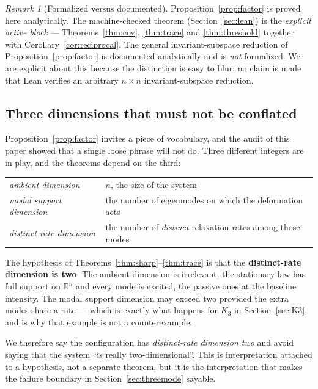\documentclass[11pt]{article}
\theoremstyle{plain}
\theoremstyle{definition}
\theoremstyle{remark}
\newtheorem{remark}[theorem]{Remark}
\newcommand{\Real}{\mathbb{R}}
\begin{document}
\begin{remark}[Formalized versus documented]\label{rem:formalized}
Proposition~\ref{prop:factor} is proved here analytically. The machine-checked theorem
(Section~\ref{sec:lean}) is the \emph{explicit active block} --- Theorems~\ref{thm:cov},
\ref{thm:trace} and \ref{thm:threshold} together with Corollary~\ref{cor:reciprocal}. The general
invariant-subspace reduction of Proposition~\ref{prop:factor} is documented analytically and is
\emph{not} formalized. We are explicit about this because the distinction is easy to blur: no
claim is made that Lean verifies an arbitrary $n\times n$ invariant-subspace reduction.
\end{remark}

\subsection{Three dimensions that must not be conflated}\label{sec:effdim}

Proposition~\ref{prop:factor} invites a piece of vocabulary, and the audit of this paper showed
that a single loose phrase will not do. Three different integers are in play, and the theorems
depend on the third:

\begin{center}
\begin{tabular}{@{}ll@{}}
\toprule
\emph{ambient dimension} & $n$, the size of the system\\
\emph{modal support dimension} & the number of eigenmodes on which the deformation acts\\
\emph{distinct-rate dimension} & the number of \emph{distinct} relaxation rates among those modes\\
\bottomrule
\end{tabular}
\end{center}

The hypothesis of Theorems~\ref{thm:sharp}--\ref{thm:trace} is that the \textbf{distinct-rate
dimension is two}. The ambient dimension is irrelevant; the stationary law has full support on
$\Real^n$ and every mode is excited, the passive ones at the baseline intensity. The modal
support dimension may exceed two provided the extra modes share a rate --- which is exactly what
happens for $K_3$ in Section~\ref{sec:K3}, and is why that example is not a counterexample.

We therefore say the configuration has \emph{distinct-rate dimension two} and avoid saying that
the system ``is really two-dimensional''. This is interpretation attached to a hypothesis, not a
separate theorem, but it is the interpretation that makes the failure boundary in
Section~\ref{sec:threemode} sayable.
\end{document}
